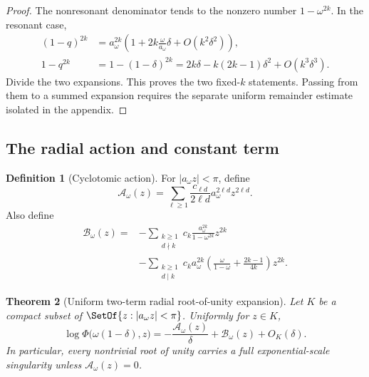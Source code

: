 \documentclass[11pt]{article}
\newtheorem{theorem}{Theorem}[section]
\theoremstyle{definition}
\newtheorem{definition}[theorem]{Definition}
\newcommand{\Aact}{\mathscr A}
\newcommand{\Bact}{\mathscr B}
\begin{document}
\begin{proof}
The nonresonant denominator tends to the nonzero number $1-\omega^{2k}$.  In the resonant case,
\begin{align*}
 (1-q)^{2k}
 &=a_\omega^{2k}
 \left(1+2k\frac{\omega}{a_\omega}\delta+O(k^2\delta^2)\right),\\
 1-q^{2k}
 &=1-(1-\delta)^{2k}
 =2k\delta-k(2k-1)\delta^2+O(k^3\delta^3).
\end{align*}
Divide the two expansions.  This proves the two fixed-$k$ statements.  Passing
from them to a summed expansion requires the separate uniform remainder
estimate isolated in the appendix.
\end{proof}

\subsection{The radial action and constant term}

\begin{definition}[Cyclotomic action]
For $|a_\omega z|<\pi$, define
\begin{equation}
 \Aact_\omega(z)
 =\sum_{\ell\ge1}
 \frac{c_{\ell d}}{2\ell d}
 a_\omega^{2\ell d}z^{2\ell d}.
 \label{eq:action-series}
\end{equation}
Also define
\begin{align}
 \Bact_\omega(z)
 =&-\sum_{\substack{k\ge1\\d\nmid k}}
 c_k\frac{a_\omega^{2k}}{1-\omega^{2k}}z^{2k}
 \label{eq:B-first}\\
 &-\sum_{\substack{k\ge1\\d\mid k}}
 c_ka_\omega^{2k}
 \left(\frac{\omega}{1-\omega}+\frac{2k-1}{4k}\right)z^{2k}.
 \label{eq:B-second}
\end{align}
\end{definition}

\begin{theorem}[Uniform two-term radial root-of-unity expansion]
\label{thm:two-term-radial}
Let $K$ be a compact subset of $\SetOf{z:|a_\omega z|<\pi}$.  Uniformly for $z\in K$,
\begin{equation}
 \boxed{
 \log\Phi\bigl(\omega(1-\delta),z\bigr)
 =-\frac{\Aact_\omega(z)}{\delta}
 +\Bact_\omega(z)+O_K(\delta).}
 \label{eq:two-term-radial}
\end{equation}
In particular, every nontrivial root of unity carries a full exponential-scale singularity unless $\Aact_\omega(z)=0$.
\end{theorem}
\end{document}
